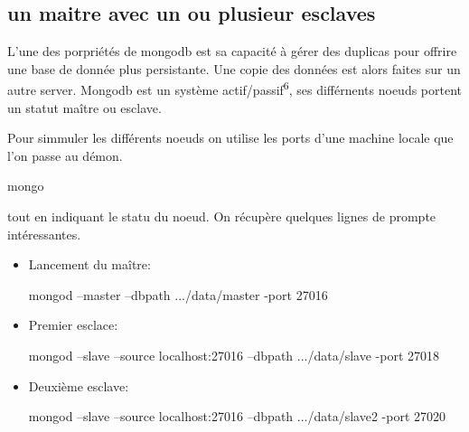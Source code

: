 \subsection{un maitre avec un ou plusieur esclaves}
    \par L'une des porpriétés de mongodb est sa capacité à gérer des duplicas pour offrire une base de donnée plus persistante. Une copie des données est alors faites sur un autre server. Mongodb est un système actif/passif\textsuperscript{6}, ses différnents noeuds portent un statut maître ou esclave.
    
    \par Pour simmuler les différents noeuds on utilise les ports d'une machine locale que l'on passe au démon. \begin{tt}mongo\end{tt} tout en indiquant le statu du noeud. On récupère quelques lignes de prompte intéressantes.
    \begin{itemize}
        \item Lancement du maître: \newline
        \begin{tt} mongod --master --dbpath .../data/master -port 27016 \end{tt}
        \item Premier esclace: \newline
        \begin{tt} mongod --slave --source localhost:27016 --dbpath .../data/slave -port 27018\end{tt}
        \item Deuxième esclave: \newline
        \begin{tt} mongod --slave --source localhost:27016 --dbpath .../data/slave2 -port 27020\end{tt}
    \end{itemize} 

    
    
